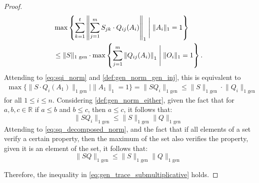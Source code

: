 \begin{proof}
\begin{equation}
  \begin{split}
  & \max \left\{ \sum_{k=1}^{t} \left\| \sum_{j=1}^{m} S_{jk} \cdot Q_{ij} (A_i) \right\|_{1}  \Biggm| \|A_i\|_{1} = 1 \right\}  \\
  & \leq  \lVert S  \rVert_{1 \text{ gen}} \cdot \max \left\{ \sum_{j=1}^{m} \left\|  Q_{ij} (A_i) \right\|_{1} \Biggm| \lVert O_i \rVert_{1} = 1 \right\}.
  \end{split}
\end{equation}
Attending to \autoref{eq:sqi_norm} and  \autoref{def:gen_norm_gen_inj}, this is equivalent to
\begin{equation}
  \begin{split}
    \max \{\lVert S \cdot Q_i (A_1) \rVert_{1 \text{ gen}} \mid \|A_1\|_{1} = 1\} = \lVert  S  Q_i  \rVert_{1 \text{ gen}} \leq \lVert S  \rVert_{1 \text{ gen}} \cdot  \lVert Q_i  \rVert_{1 \text{ gen}} 
  \end{split}
\end{equation}
for all $1 \leq i \leq n$. Considering \autoref{def:gen_norm_either}, given the fact that for $a,b,c \in \mathbb{R}$ if $a \leq b$ and $b \leq c$, then $a \leq c$, it follows that:
\begin{equation}
  \lVert S  Q_i \rVert_{1 \text{ gen}} \leq \lVert S \rVert_{1 \text{ gen}} \lVert Q \rVert_{1 \text{ gen}}
\end{equation}
Attending to \autoref{eq:sq_decomposed_norm}, and the fact that if all elements of a set verify a certain property, then the maximum of the set also verifies the property, given it is an element of the set, it follows that:
\begin{equation}
  \lVert S  Q \rVert_{1 \text{ gen}} \leq \lVert S \rVert_{1 \text{ gen}} \lVert Q \rVert_{1 \text{ gen}}
\end{equation}

Therefore, the inequality in \autoref{eq:gen_trace_submultiplicative} holds.



\end{proof}


